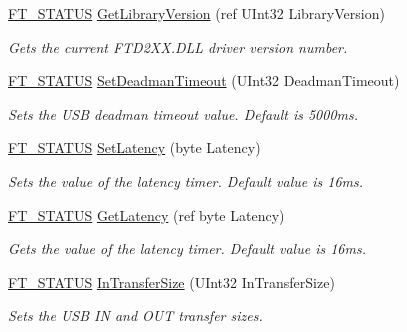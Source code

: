 \begin{DoxyCompactItemize}
\mbox{\hyperlink{class_f_t_d2_x_x___n_e_t_1_1_f_t_d_i_aabe20ad905cc4ccc1e35dd5b877d9a83}{F\+T\+\_\+\+S\+T\+A\+T\+US}} \mbox{\hyperlink{class_f_t_d2_x_x___n_e_t_1_1_f_t_d_i_a8f16ac8cc769209367eef908551e2351}{Get\+Library\+Version}} (ref U\+Int32 Library\+Version)
\begin{DoxyCompactList}\small\item\em Gets the current F\+T\+D2\+X\+X.\+D\+LL driver version number. \end{DoxyCompactList}\item 
\mbox{\hyperlink{class_f_t_d2_x_x___n_e_t_1_1_f_t_d_i_aabe20ad905cc4ccc1e35dd5b877d9a83}{F\+T\+\_\+\+S\+T\+A\+T\+US}} \mbox{\hyperlink{class_f_t_d2_x_x___n_e_t_1_1_f_t_d_i_a9fe14ce5d7638c0e3b28ecc2b2a87871}{Set\+Deadman\+Timeout}} (U\+Int32 Deadman\+Timeout)
\begin{DoxyCompactList}\small\item\em Sets the U\+SB deadman timeout value. Default is 5000ms. \end{DoxyCompactList}\item 
\mbox{\hyperlink{class_f_t_d2_x_x___n_e_t_1_1_f_t_d_i_aabe20ad905cc4ccc1e35dd5b877d9a83}{F\+T\+\_\+\+S\+T\+A\+T\+US}} \mbox{\hyperlink{class_f_t_d2_x_x___n_e_t_1_1_f_t_d_i_a4dcd23d950cfd882a1ff57531e631602}{Set\+Latency}} (byte Latency)
\begin{DoxyCompactList}\small\item\em Sets the value of the latency timer. Default value is 16ms. \end{DoxyCompactList}\item 
\mbox{\hyperlink{class_f_t_d2_x_x___n_e_t_1_1_f_t_d_i_aabe20ad905cc4ccc1e35dd5b877d9a83}{F\+T\+\_\+\+S\+T\+A\+T\+US}} \mbox{\hyperlink{class_f_t_d2_x_x___n_e_t_1_1_f_t_d_i_a23f37b06cc5e7b2a6c9d2fec2a0135cc}{Get\+Latency}} (ref byte Latency)
\begin{DoxyCompactList}\small\item\em Gets the value of the latency timer. Default value is 16ms. \end{DoxyCompactList}\item 
\mbox{\hyperlink{class_f_t_d2_x_x___n_e_t_1_1_f_t_d_i_aabe20ad905cc4ccc1e35dd5b877d9a83}{F\+T\+\_\+\+S\+T\+A\+T\+US}} \mbox{\hyperlink{class_f_t_d2_x_x___n_e_t_1_1_f_t_d_i_a69f86e539ff65307def2cc227cc73154}{In\+Transfer\+Size}} (U\+Int32 In\+Transfer\+Size)
\begin{DoxyCompactList}\small\item\em Sets the U\+SB IN and O\+UT transfer sizes. \end{DoxyCompactList}\item 

\end{DoxyCompactItemize}
